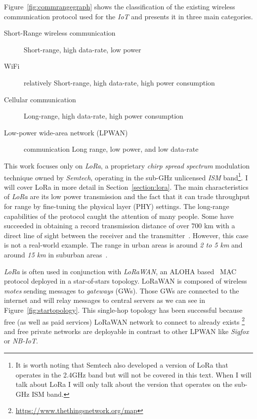 Figure~\ref{fig:commrangegraph} shows the classification
of the existing wireless communication protocol used for the \emph{IoT} and
presents it in three main categories.

\begin{description}
    \item[Short-Range wireless communication] Short-range, high
        data-rate, low power
    \item[WiFi] relatively Short-range, high
        data-rate, high power consumption
    \item[Cellular communication] Long-range, high data-rate, high power
        consumption
    \item[Low-power wide-area network (LPWAN)] communication Long range,
        low power, and low data-rate
\end{description}



This work focuses only on \emph{LoRa}, a proprietary \emph{chirp spread spectrum}
modulation technique owned by \emph{Semtech}, operating in the sub-GHz
unlicensed \emph{ISM} band\footnote{It is worth noting that Semtech also developed a version of LoRa that
operates in the 2.4GHz band but will not be covered in this text. When I will talk
about LoRa I will only talk about the version that operates on the sub-GHz ISM band.}. 
I will cover LoRa in more detail in Section~\ref{section:lora}.
The main characteristics of \emph{LoRa} are its low power transmission and the
fact that it can trade throughput for range by fine-tuning the physical layer
(PHY) settings.
The long-range capabilities of the protocol caught the attention of
many people. 
Some have succeeded in obtaining a record transmission distance of over 700 km with
a direct line of sight between the receiver and the
transmitter~\cite{network_2017}.
However, this case is not a real-world example. The range in urban areas is
around \emph{2 to 5 km} and around \emph{15 km} in suburban
areas~\cite{8030482}.

\emph{LoRa} is often used in conjunction with \emph{LoRaWAN}, an ALOHA 
based~\cite{loraalliance:lorawanspecification} MAC protocol deployed in a star-of-stars 
topology.
LoRaWAN is composed of wireless \emph{motes} sending messages to \emph{gateways} (GWs).
Those GWs are connected to the internet and will relay messages to central servers
as we can see in Figure~\ref{fig:startopology}.
This single-hop topology has been successful because free (as well as paid
services) LoRaWAN network to connect to already exists
\footnote{\url{https://www.thethingsnetwork.org/map}} and free private networks are
deployable in contrast to other LPWAN like \emph{Sigfox} or \emph{NB-IoT}.

